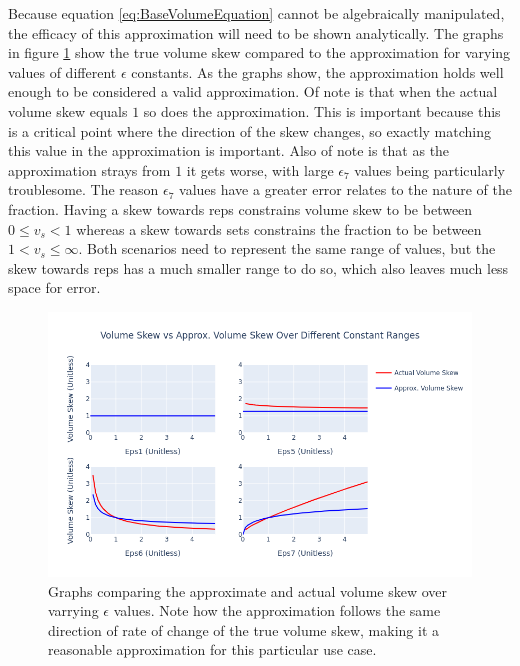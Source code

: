 Because equation \ref{eq:BaseVolumeEquation} cannot be algebraically manipulated, the efficacy of this approximation will need to be shown analytically. The graphs in figure \ref{fig:ApproximateVsActualVolumeSkew} show the true volume skew compared to the approximation for varying values of different $\epsilon$ constants. As the graphs show, the approximation holds well enough to be considered a valid approximation. Of note is that when the actual volume skew equals $1$ so does the approximation. This is important because this is a critical point where the direction of the skew changes, so exactly matching this value in the approximation is important. Also of note is that as the approximation strays from $1$ it gets worse, with large $\epsilon_7$ values being particularly troublesome. The reason $\epsilon_7$ values have a greater error relates to the nature of the fraction. Having a skew towards reps constrains volume skew to be between $0\le v_s<1$ whereas a skew towards sets constrains the fraction to be between $1<v_s\le \infty$. Both scenarios need to represent the same range of values, but the skew towards reps has a much smaller range to do so, which also leaves much less space for error.

\begin{figure}[htb]
    \centering
    \includegraphics[scale=0.55]{images/ch3/ApproxVsActualVolumeSkew.basic.png}
    \caption{Graphs comparing the approximate and actual volume skew over varrying $\epsilon$ values. Note how the approximation follows the same direction of rate of change of the true volume skew, making it a reasonable approximation for this particular use case.}
    \label{fig:ApproximateVsActualVolumeSkew}
\end{figure}


